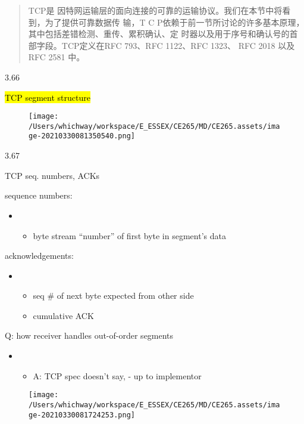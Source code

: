 \documentclass[
]{article}
\begin{document}
\begin{quote}
TCP是
因特网运输层的面向连接的可靠的运输协议。我们在本节中将看到，为了提供可靠数据传
输，T C
P依赖于前一节所讨论的许多基本原理，其中包括差错检测、重传、累积确认、定
时器以及用于序号和确认号的首部字段。TCP定义在RFC 793、RFC 1122、RFC
1323、 RFC 2018 以及 RFC 2581 中。
\end{quote}

3.66

\hl{TCP segment structure}

\begin{figure}
\centering
\texttt{[image: /Users/whichway/workspace/E\_ESSEX/CE265/MD/CE265.assets/image-20210330081350540.png]}
\caption{}
\end{figure}

3.67

TCP seq. numbers, ACKs

sequence numbers:

\begin{itemize}
\item
  \begin{itemize}
  \item
    byte stream ``number'' of first byte in segment's data
  \end{itemize}
\end{itemize}

acknowledgements:

\begin{itemize}
\item
  \begin{itemize}
  \item
    seq \# of next byte expected from other side
  \item
    cumulative ACK
  \end{itemize}
\end{itemize}

Q: how receiver handles out-of-order segments

\begin{itemize}
\item
  \begin{itemize}
  \item
    A: TCP spec doesn't say, - up to implementor
  \end{itemize}
\end{itemize}

\begin{figure}
\centering
\texttt{[image: /Users/whichway/workspace/E\_ESSEX/CE265/MD/CE265.assets/image-20210330081724253.png]}
\caption{}
\end{figure}
\end{document}
